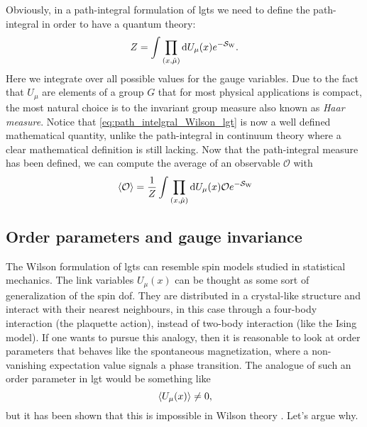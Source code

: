 Obviously, in a path-integral formulation of \ac{lgt}s we need to define the path-integral in order to have a quantum theory:
\begin{equation}
    Z = \int \prod_{(x, \hat{\mu})}  \dd U_{\mu}(x) e^{- \mathcal{S}_{\text{W}}}.
    \label{eq:path_intelgral_Wilson_lgt}
\end{equation}
Here we integrate over all possible values for the gauge variables.
Due to the fact that $U_{\mu}$ are elements of a group $G$ that for most physical applications is compact, the most natural choice is to the invariant group measure also known as \emph{Haar measure}\citneeded.
Notice that \eqref{eq:path_intelgral_Wilson_lgt} is now a well defined mathematical quantity, unlike the path-integral in continuum theory where a clear mathematical definition is still lacking.
Now that the path-integral measure has been defined, we can compute the average of an observable $\mathcal{O}$ with
\begin{equation}
    \ev*{\mathcal{O}} = \frac{1}{Z} \int \prod_{(x, \hat{\mu})} \dd U_{\mu}(x) \mathcal{O} e^{- \Action_{\text{W}}}
\end{equation}


%
%
\subsection{Order parameters and gauge invariance}
\label{sub:wilson_confinement_test}

The Wilson formulation of \ac{lgt}s can resemble spin models studied in statistical mechanics.
The link variables $U_{\mu}(x)$ can be thought as some sort of generalization of the spin \ac{dof}.
They are distributed in a crystal-like structure and interact with their nearest neighbours, in this case through a four-body interaction (the plaquette action), instead of two-body interaction (like the Ising model).
If one wants to pursue this analogy, then it is reasonable to look at order parameters that behaves like the spontaneous magnetization, where a non-vanishing expectation value signals a phase transition.
The analogue of such an order parameter in \ac{lgt} would be something like
\begin{equation}
    \ev*{U_{\mu}(x)} \neq 0,
    \label{eq:non_zero_link_var_expt_value}
\end{equation}
but it has been shown that this is impossible in Wilson theory \cite{elitzur1975theorem}.
Let's argue why.

